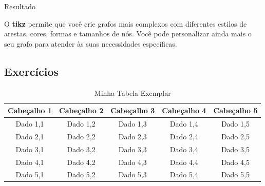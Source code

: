 \begin{trailer}{Resultado}
\begin{center}
\end{center}
\end{trailer}

\noindent O \textbf{tikz} permite que você crie grafos mais complexos com diferentes estilos de arestas, cores, formas e tamanhos de n\'os. Voc\^e pode personalizar ainda mais o seu grafo para atender \`as suas necessidades espec\'ificas.

\subsection{Exerc\'icios}

\begin{prob}
    
\end{prob}
\begin{table}[h]
\centering
\caption{Minha Tabela Exemplar}
\label{tab:exemplo}
\begin{tabular}{|c|c|c|c|c|}
\hline
Cabeçalho 1 & Cabeçalho 2 & Cabeçalho 3 & Cabeçalho 4 & Cabeçalho 5 \\ \hline
Dado 1,1 & Dado 1,2 & Dado 1,3 & Dado 1,4 & Dado 1,5 \\ \hline
Dado 2,1 & Dado 2,2 & Dado 2,3 & Dado 2,4 & Dado 2,5 \\ \hline
Dado 3,1 & Dado 3,2 & Dado 3,3 & Dado 3,4 & Dado 3,5 \\ \hline
Dado 4,1 & Dado 4,2 & Dado 4,3 & Dado 4,4 & Dado 4,5 \\ \hline
Dado 5,1 & Dado 5,2 & Dado 5,3 & Dado 5,4 & Dado 5,5 \\ \hline
\end{tabular}
\end{table}

